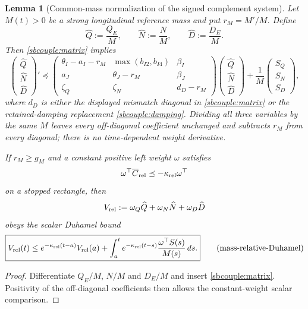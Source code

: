 \documentclass{article} %
\theoremstyle{plain}
\newtheorem{lemma}[theorem]{Lemma}
\theoremstyle{definition}
\theoremstyle{remark}
\begin{document}
\begin{lemma}[Common-mass normalization of the signed complement system]
\label{sbcouple:mass-relative}
Let $M(t)>0$ be a strong longitudinal reference mass and put
$r_M=M'/M$.  Define
\[
 \widehat Q:=\frac{Q_E}{M},\qquad
 \widehat N:=\frac{N}{M},\qquad
 \widehat D:=\frac{D_E}{M}.
\]
Then \eqref{sbcouple:matrix} implies
\[
\boxed{
 \begin{pmatrix}\widehat Q\\\widehat N\\\widehat D\end{pmatrix}'
 \preceq
 \begin{pmatrix}
 \theta_I-a_I-r_M&\max(b_{I2},b_{I4})&\beta_I\\
 a_J&\theta_J-r_M&\beta_J\\
 \zeta_Q&\zeta_N&d_D-r_M
 \end{pmatrix}
 \begin{pmatrix}\widehat Q\\\widehat N\\\widehat D\end{pmatrix}
 +\frac1M\begin{pmatrix}S_Q\\S_N\\S_D\end{pmatrix},
}
\tag{mass-relative-comparison}\label{sbcouple:mass-relative-comparison}
\]
where $d_D$ is either the displayed mismatch diagonal in
\eqref{sbcouple:matrix} or the retained-damping replacement
\eqref{sbcouple:damping}.  Dividing all three variables by the same $M$
leaves every off-diagonal coefficient unchanged and subtracts $r_M$ from
every diagonal; there is no time-dependent weight derivative.

If $r_M\ge g_M$ and a constant positive left weight $\omega$ satisfies
\[
 \omega^\top\overline C_{\rm rel}\preceq
 -\kappa_{\rm rel}\omega^\top
\]
on a stopped rectangle, then
\[
 V_{\rm rel}:=\omega_Q\widehat Q+\omega_N\widehat N+\omega_D\widehat D
\]
obeys the scalar Duhamel bound
\[
\boxed{
 V_{\rm rel}(t)
 \le e^{-\kappa_{\rm rel}(t-a)}V_{\rm rel}(a)
 +\int_a^t e^{-\kappa_{\rm rel}(t-s)}
 \frac{\omega^\top S(s)}{M(s)}\,ds.
}
\tag{mass-relative-Duhamel}\label{sbcouple:mass-relative-Duhamel}
\]
\end{lemma}
\begin{proof}
Differentiate $Q_E/M$, $N/M$ and $D_E/M$ and insert
\eqref{sbcouple:matrix}.  Positivity of the off-diagonal coefficients then
allows the constant-weight scalar comparison.
\end{proof}
\end{document}
